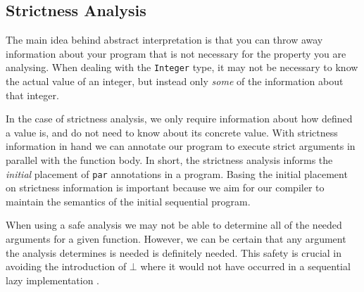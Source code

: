 \subsection{Strictness Analysis}

The main idea behind abstract interpretation is that you can throw away
information about your program that is not necessary for the property you are
analysing. When dealing with the \verb'Integer' type, it may not be necessary to
know the actual value of an integer, but instead only \emph{some} of the
information about that integer. 

In the case of strictness analysis, we only require information about how
defined a value is, and do not need to know about its concrete value.
With strictness information in hand we can annotate our program to execute
strict arguments in parallel with the function body. In short, the strictness
analysis informs the \emph{initial} placement of \verb'par' annotations in a
program. Basing the initial placement on strictness information is important
because we aim for our compiler to maintain the semantics of the initial
sequential program.

When using a safe analysis we
may not be able to determine all of the needed arguments for a given function.
However, we can be certain that any argument the analysis determines is needed is
definitely needed. This safety is crucial in avoiding the introduction of
$\bot$ where it would not have occurred in a sequential lazy implementation
\cite{wadler1987strictness}.


